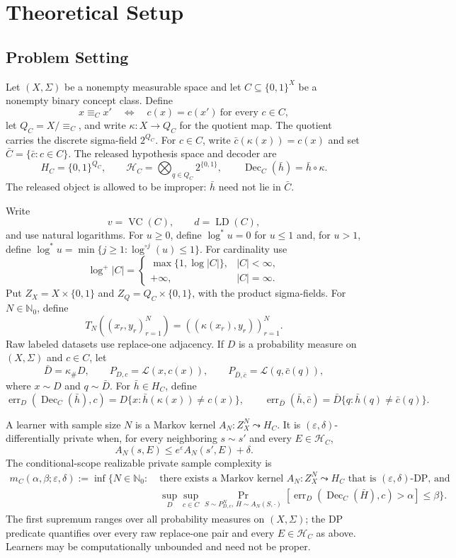 \section{Theoretical Setup}\label{sec:setup}

\subsection{Problem Setting}
Let $(X,\Sigma)$ be a nonempty measurable space and let
$C\subseteq\{0,1\}^{X}$ be a nonempty binary concept class.  Define
\[
x\equiv_C x'\quad\Longleftrightarrow\quad
c(x)=c(x')\ \text{for every }c\in C,
\]
let $Q_C=X/{\equiv_C}$, and write $\kappa:X\to Q_C$ for the quotient map.
The quotient carries the discrete sigma-field $2^{Q_C}$.  For $c\in C$,
write $\bar c(\kappa(x))=c(x)$ and set
$\bar C=\{\bar c:c\in C\}$.  The released hypothesis space and decoder are
\[
 H_C=\{0,1\}^{Q_C},\qquad
 \mathcal H_C=\bigotimes_{q\in Q_C}2^{\{0,1\}},\qquad
 \operatorname{Dec}_C(\bar h)=\bar h\circ\kappa .
\]
The released object is allowed to be improper: $\bar h$ need not lie in
$\bar C$.

Write
\[
 v=\operatorname{VC}(C),\qquad d=\operatorname{LD}(C),
\]
and use natural logarithms.  For $u\ge0$, define $\log^*u=0$ for
$u\le1$ and, for $u>1$, define
$\log^*u=\min\{j\ge1:\log^{\circ j}(u)\le1\}$.  For cardinality use
\[
\log^+|C|=\begin{cases}\max\{1,\log|C|\},&|C|<\infty,\\
 +\infty,&|C|=\infty.
 \end{cases}
\]
Put $Z_X=X\times\{0,1\}$ and $Z_Q=Q_C\times\{0,1\}$, with the product
sigma-fields.  For $N\in\mathbb N_0$, define
\[
 T_N((x_r,y_r)_{r=1}^{N})=((\kappa(x_r),y_r))_{r=1}^{N}.
\]
Raw labeled datasets use replace-one adjacency.  If $D$ is a probability
measure on $(X,\Sigma)$ and $c\in C$, let
\[
 \bar D=\kappa_\#D,\qquad
 P_{D,c}=\mathcal L(x,c(x)),\qquad
 P_{\bar D,\bar c}=\mathcal L(q,\bar c(q)),
\]
where $x\sim D$ and $q\sim\bar D$.  For $\bar h\in H_C$, define
\[
 \operatorname{err}_D(\operatorname{Dec}_C(\bar h),c)
 =D\{x:\bar h(\kappa(x))\ne c(x)\},\qquad
 \operatorname{err}_{\bar D}(\bar h,\bar c)
 =\bar D\{q:\bar h(q)\ne\bar c(q)\}.
\]

A learner with sample size $N$ is a Markov kernel
$A_N:Z_X^N\leadsto H_C$.  It is $(\varepsilon,\delta)$-differentially
private when, for every neighboring $s\sim s'$ and every
$E\in\mathcal H_C$,
\[
 A_N(s,E)\le e^{\varepsilon}A_N(s',E)+\delta .
\]
The conditional-scope realizable private sample complexity is
\[
\begin{aligned}
m_C(\alpha,\beta;\varepsilon,\delta):=\inf\bigl\{N\in\mathbb N_0:\;&\text{there exists a Markov kernel }A_N:
 Z_X^N\leadsto H_C\text{ that is }(\varepsilon,\delta)\text{-DP, and}\\[-2pt]
&\sup_D\sup_{c\in C}\Pr_{S\sim P_{D,c}^{N},\,\bar H\sim A_N(S,\cdot)}
 [\operatorname{err}_D(\operatorname{Dec}_C(\bar H),c)>\alpha]\le\beta\bigr\}.
\end{aligned}
\]
The first supremum ranges over all probability measures on $(X,\Sigma)$;
the DP predicate quantifies over every raw replace-one pair and every
$E\in\mathcal H_C$ as above.  Learners may be computationally unbounded and
need not be proper.

